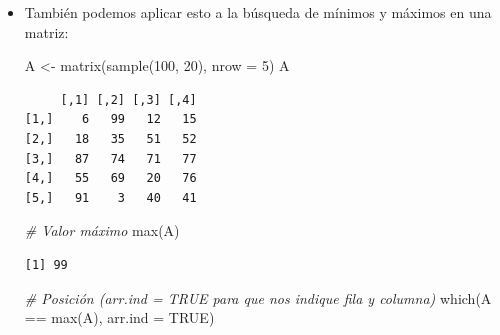 \documentclass[
]{book}
\newenvironment{Shaded}{\begin{snugshade}}{\end{snugshade}}
\newcommand{\AttributeTok}[1]{\textcolor[rgb]{0.77,0.63,0.00}{#1}}
\newcommand{\CommentTok}[1]{\textcolor[rgb]{0.56,0.35,0.01}{\textit{#1}}}
\newcommand{\ConstantTok}[1]{\textcolor[rgb]{0.00,0.00,0.00}{#1}}
\newcommand{\DecValTok}[1]{\textcolor[rgb]{0.00,0.00,0.81}{#1}}
\newcommand{\FunctionTok}[1]{\textcolor[rgb]{0.00,0.00,0.00}{#1}}
\newcommand{\NormalTok}[1]{#1}
\newcommand{\OtherTok}[1]{\textcolor[rgb]{0.56,0.35,0.01}{#1}}
\newcommand{\SpecialCharTok}[1]{\textcolor[rgb]{0.00,0.00,0.00}{#1}}
\begin{document}
\begin{itemize}
\begin{verbatim}
[1] 2
\end{verbatim}

\begin{Shaded}
\begin{Highlighting}[]
\CommentTok{\# Pero podemos obtener todas las posiciones así:}
\FunctionTok{which}\NormalTok{(w }\SpecialCharTok{==} \FunctionTok{max}\NormalTok{(w))}
\end{Highlighting}
\end{Shaded}

\begin{verbatim}
[1] 2 5
\end{verbatim}
\item
  También podemos aplicar esto a la búsqueda de mínimos y máximos en una matriz:

\begin{Shaded}
\begin{Highlighting}[]
\NormalTok{A }\OtherTok{\textless{}{-}} \FunctionTok{matrix}\NormalTok{(}\FunctionTok{sample}\NormalTok{(}\DecValTok{100}\NormalTok{, }\DecValTok{20}\NormalTok{), }\AttributeTok{nrow =} \DecValTok{5}\NormalTok{)}
\NormalTok{A}
\end{Highlighting}
\end{Shaded}

\begin{verbatim}
     [,1] [,2] [,3] [,4]
[1,]    6   99   12   15
[2,]   18   35   51   52
[3,]   87   74   71   77
[4,]   55   69   20   76
[5,]   91    3   40   41
\end{verbatim}

\begin{Shaded}
\begin{Highlighting}[]
\CommentTok{\# Valor máximo}
\FunctionTok{max}\NormalTok{(A)}
\end{Highlighting}
\end{Shaded}

\begin{verbatim}
[1] 99
\end{verbatim}

\begin{Shaded}
\begin{Highlighting}[]
\CommentTok{\# Posición (arr.ind = TRUE para que nos indique fila y columna)}
\FunctionTok{which}\NormalTok{(A }\SpecialCharTok{==} \FunctionTok{max}\NormalTok{(A), }\AttributeTok{arr.ind =} \ConstantTok{TRUE}\NormalTok{)}
\end{Highlighting}
\end{Shaded}


\end{itemize}
\end{document}
